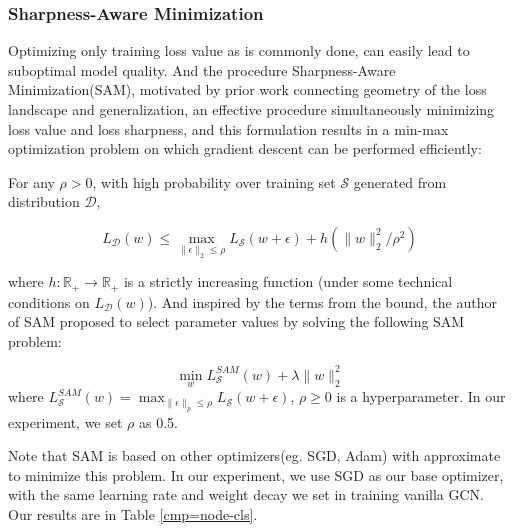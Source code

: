 \documentclass[fleqn,10pt]{SelfArx} %
\begin{document}
\subsubsection{Sharpness-Aware Minimization}
Optimizing only training loss value as is commonly done, can easily 
lead to suboptimal model quality. And the procedure Sharpness-Aware 
Minimization(SAM)\cite{foret2020sharpness}, motivated by prior work connecting geometry of 
the loss landscape and generalization, an effective procedure 
simultaneously minimizing loss value and loss sharpness, and this 
formulation results in a min-max optimization problem on which gradient 
descent can be performed efficiently:

For any $\rho > 0$, with high probability over training set $\mathcal{S}$ 
generated from distribution $\mathcal{D}$,
\begin{small}
\begin{equation}
	L_{\mathcal{D}}(w) \leq \max_{\|\epsilon \|_{2} \leq \rho} L_{\mathcal{S}}(w + \epsilon) + h(\|w\|_{2}^{2}/ \rho^{2})
\end{equation}
\end{small}
where $h: \mathbb{R}_{+}\rightarrow \mathbb{R}_{+}$ is a strictly increasing function (under some technical conditions on $L_{\mathcal{D}}(w)$). And inspired by the terms from the bound, the author of SAM proposed to select parameter values by 
solving the following SAM problem:
\begin{small}
	\begin{equation}
		\min_{w} L_{\mathcal{S}}^{SAM}(w) + \lambda \|w\|_{2}^{2}  
	\end{equation}
	where $L_{\mathcal{S}}^{SAM}(w) = \max_{\|\epsilon\|_{p} \leq \rho} L_{\mathcal{S}}(w+\epsilon)$, 
	$\rho \geq 0$ is a hyperparameter. In our experiment, we set $\rho$ as 0.5.
\end{small}

Note that SAM is based on other optimizers(eg. SGD, Adam) with approximate to minimize this problem. In our experiment, we use SGD as our base optimizer, with the same learning rate and weight decay we set in training vanilla GCN. Our results are in Table \ref{cmp=node-cls}.

\begin{table}
	\centering
\caption{Node classification with different optimizers}
\label{cmp=node-cls}
\end{table}
\end{document}
